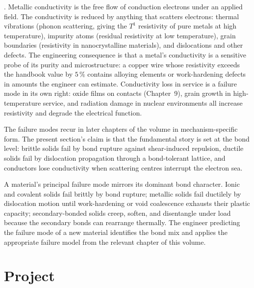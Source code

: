 . Metallic conductivity is the
free flow of conduction electrons under an applied field. The
conductivity is reduced by anything that scatters electrons:
thermal vibrations (phonon scattering, giving the $T^1$ resistivity of
pure metals at high temperature), impurity atoms (residual resistivity
at low temperature), grain boundaries (resistivity in
nanocrystalline materials), and dislocations and other defects. The
engineering consequence is that a metal's conductivity is a sensitive
probe of its purity and microstructure: a copper wire whose
resistivity exceeds the handbook value by $5\,\%$ contains alloying
elements or work-hardening defects in amounts the engineer can
estimate. Conductivity loss in service is a failure mode in its own
right: oxide films on contacts (Chapter~9), grain growth in
high-temperature service, and radiation damage in nuclear environments
all increase resistivity and degrade the electrical function.

The failure modes recur in later chapters of the volume in
mechanism-specific form. The present section's claim is that the
fundamental story is set at the bond level: brittle solids fail by
bond rupture against shear-induced repulsion, ductile solids fail by
dislocation propagation through a bond-tolerant lattice, and
conductors lose conductivity when scattering centres interrupt the
electron sea.

\begin{principle}
A material's principal failure mode mirrors its dominant bond
character. Ionic and covalent solids fail brittly by bond rupture;
metallic solids fail ductilely by dislocation motion until
work-hardening or void coalescence exhausts their plastic capacity;
secondary-bonded solids creep, soften, and disentangle under load
because the secondary bonds can rearrange thermally. The engineer
predicting the failure mode of a new material identifies the bond
mix and applies the appropriate failure model from the relevant
chapter of this volume.
\end{principle}

\section{Project}


